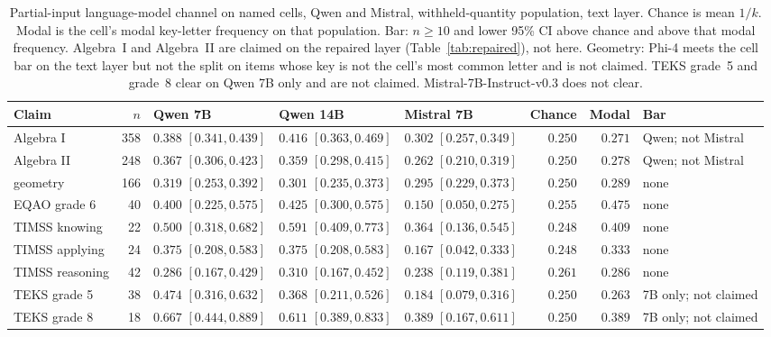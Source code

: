 \begin{table}[t]
  \caption{Partial-input language-model channel on named cells, Qwen and Mistral, withheld-quantity population, text layer. Chance is mean $1/k$. Modal is the cell's modal key-letter frequency on that population. Bar: $n\ge 10$ and lower 95\% CI above chance and above that modal frequency. Algebra~I and Algebra~II are claimed on the repaired layer (Table~\ref{tab:repaired}), not here. Geometry: Phi-4 meets the cell bar on the text layer but not the split on items whose key is not the cell's most common letter and is not claimed. TEKS grade~5 and grade~8 clear on Qwen 7B only and are not claimed. Mistral-7B-Instruct-v0.3 does not clear.}
  \label{tab:masked}
  \centering
  \scriptsize
  \begin{tabular}{l r l l l r r l}
    \toprule
    Claim & $n$ & Qwen 7B & Qwen 14B & Mistral 7B & Chance & Modal & Bar \\
    \midrule
    Algebra I & 358 & $0.388$ $[0.341, 0.439]$ & $0.416$ $[0.363, 0.469]$ & $0.302$ $[0.257, 0.349]$ & $0.250$ & $0.271$ & Qwen; not Mistral \\
    Algebra II & 248 & $0.367$ $[0.306, 0.423]$ & $0.359$ $[0.298, 0.415]$ & $0.262$ $[0.210, 0.319]$ & $0.250$ & $0.278$ & Qwen; not Mistral \\
    geometry & 166 & $0.319$ $[0.253, 0.392]$ & $0.301$ $[0.235, 0.373]$ & $0.295$ $[0.229, 0.373]$ & $0.250$ & $0.289$ & none \\
    EQAO grade 6 & 40 & $0.400$ $[0.225, 0.575]$ & $0.425$ $[0.300, 0.575]$ & $0.150$ $[0.050, 0.275]$ & $0.255$ & $0.475$ & none \\
    TIMSS knowing & 22 & $0.500$ $[0.318, 0.682]$ & $0.591$ $[0.409, 0.773]$ & $0.364$ $[0.136, 0.545]$ & $0.248$ & $0.409$ & none \\
    TIMSS applying & 24 & $0.375$ $[0.208, 0.583]$ & $0.375$ $[0.208, 0.583]$ & $0.167$ $[0.042, 0.333]$ & $0.248$ & $0.333$ & none \\
    TIMSS reasoning & 42 & $0.286$ $[0.167, 0.429]$ & $0.310$ $[0.167, 0.452]$ & $0.238$ $[0.119, 0.381]$ & $0.261$ & $0.286$ & none \\
    TEKS grade 5 & 38 & $0.474$ $[0.316, 0.632]$ & $0.368$ $[0.211, 0.526]$ & $0.184$ $[0.079, 0.316]$ & $0.250$ & $0.263$ & 7B only; not claimed \\
    TEKS grade 8 & 18 & $0.667$ $[0.444, 0.889]$ & $0.611$ $[0.389, 0.833]$ & $0.389$ $[0.167, 0.611]$ & $0.250$ & $0.389$ & 7B only; not claimed \\
    \bottomrule
  \end{tabular}
\end{table}

